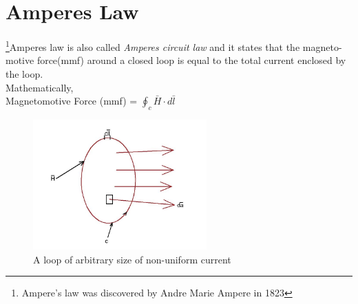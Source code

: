 \section{Amperes Law}
\footnote[7]{Ampere's law was discovered by Andre Marie Ampere in 1823 }Amperes law is also called \emph{Amperes circuit law} and it states that the magneto-motive force(mmf) around a closed loop is equal to the total current enclosed by the loop.\\
Mathematically, \\
Magnetomotive Force (mmf) = $\oint_c \bar{H} \cdot d\bar{l}$ 
\begin{figure}[h]
\centering
\includegraphics[height=5cm]{./graphics/j}
\caption{A loop of arbitrary size of non-uniform current}
\label{fig:j}
\end{figure}


